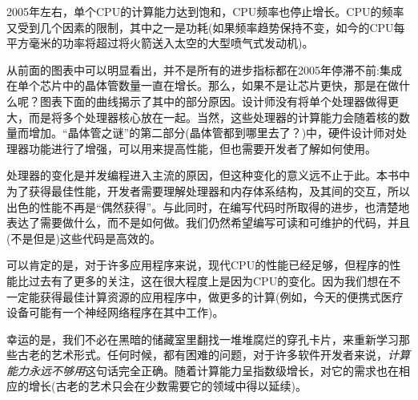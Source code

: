 2005年左右，单个CPU的计算能力达到饱和，CPU频率也停止增长。CPU的频率又受到几个因素的限制，其中之一是功耗(如果频率趋势保持不变，如今的CPU每平方毫米的功率将超过将火箭送入太空的大型喷气式发动机)。

从前面的图表中可以明显看出，并不是所有的进步指标都在2005年停滞不前:集成在单个芯片中的晶体管数量一直在增长。那么，如果不是让芯片更快，那是在做什么呢？图表下面的曲线揭示了其中的部分原因。设计师没有将单个处理器做得更大，而是将多个处理器核心放在一起。当然，这些处理器的计算能力会随着核的数量而增加。“晶体管之谜”的第二部分(晶体管都到哪里去了？)中，硬件设计师对处理器功能进行了增强，可以用来提高性能，但也需要开发者了解如何使用。

处理器的变化是并发编程进入主流的原因，但这种变化的意义远不止于此。本书中为了获得最佳性能，开发者需要理解处理器和内存体系结构，及其间的交互，所以出色的性能不再是“偶然获得”。与此同时，在编写代码时所取得的进步，也清楚地表达了需要做什么，而不是如何做。我们仍然希望编写可读和可维护的代码，并且(不是但是)这些代码是高效的。

可以肯定的是，对于许多应用程序来说，现代CPU的性能已经足够，但程序的性能比过去有了更多的关注，这在很大程度上是因为CPU的变化。因为我们想在不一定能获得最佳计算资源的应用程序中，做更多的计算(例如，今天的便携式医疗设备可能有一个神经网络程序在其中工作)。

幸运的是，我们不必在黑暗的储藏室里翻找一堆堆腐烂的穿孔卡片，来重新学习那些古老的艺术形式。任何时候，都有困难的问题，对于许多软件开发者来说，\textit{计算能力永远不够用}这句话完全正确。随着计算能力呈指数级增长，对它的需求也在相应的增长(古老的艺术只会在少数需要它的领域中得以延续)。











